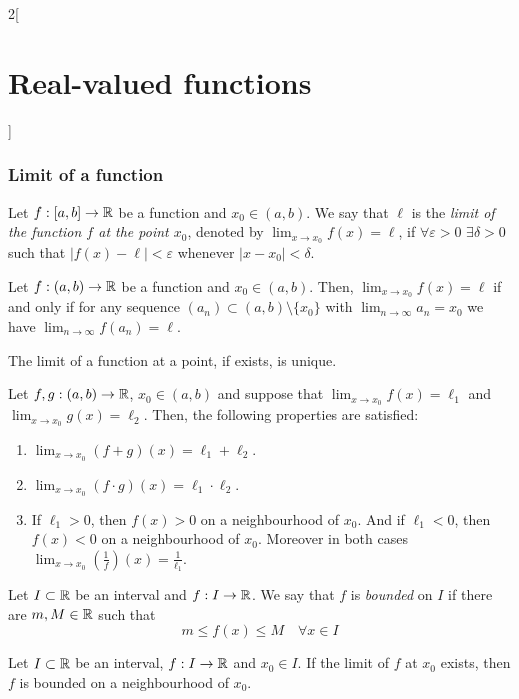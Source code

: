 \documentclass[../../../main_math.tex]{subfiles}
\begin{document}
\begin{multicols}{2}[\section{Real-valued functions}]
  \subsubsection{Limit of a function}
  \begin{definition}
    Let $f:[a,b]\rightarrow\mathbb{R}$ be a function and $x_0\in(a,b)$. We say that $\ell$ is the \emph{limit of the function $f$ at the point $x_0$}, denoted by $\displaystyle\lim_{x\to x_0}f(x)=\ell$, if $\forall\varepsilon>0$ $\exists\delta>0$ such that $|f(x)-\ell|<\varepsilon$ whenever $|x-x_0|<\delta$.
  \end{definition}
  \begin{lemma}
    Let $f:(a,b)\rightarrow\mathbb{R}$ be a function and $x_0\in(a,b)$. Then, $\displaystyle\lim_{x\to x_0}f(x)=\ell$ if and only if for any sequence $(a_n)\subset(a,b)\setminus\{x_0\}$ with $\displaystyle\lim_{n\to\infty} a_n=x_0$ we have $\displaystyle\lim_{n\to\infty}  f(a_n)=\ell$.
  \end{lemma}
  \begin{lemma}
    The limit of a function at a point, if exists, is unique.
  \end{lemma}
  \begin{proposition}
    Let $f,g:(a,b)\rightarrow\mathbb{R}$, $x_0\in(a,b)$ and suppose that $\displaystyle\lim_{x\to x_0}f(x)=\ell_1$ and $\displaystyle\lim_{x\to x_0}g(x)=\ell_2$. Then, the following properties are satisfied:
    \begin{enumerate}
      \item $\displaystyle\lim_{x\to x_0}(f+g)(x)=\ell_1+\ell_2$.
      \item $\displaystyle\lim_{x\to x_0}(f\cdot g)(x)=\ell_1\cdot\ell_2$.
      \item If $\ell_1>0$, then $f(x)>0$ on a neighbourhood of $x_0$. And if $\ell_1<0$, then $f(x)<0$ on a neighbourhood of $x_0$. Moreover in both cases $\displaystyle\lim_{x\to x_0}\left(\frac{1}{f}\right)(x)=\frac{1}{\ell_1}$.
    \end{enumerate}
  \end{proposition}
  \begin{definition}
    Let $I\subset\mathbb{R}$ be an interval and $f:I\rightarrow\mathbb{R}$. We say that $f$ is \emph{bounded} on $I$ if there are $m,M\in\mathbb{R}$ such that $$m\leq f(x)\leq M\quad\forall x\in I$$
  \end{definition}
  \begin{lemma}
    Let $I\subset\mathbb{R}$ be an interval, $f:I\rightarrow\mathbb{R}$ and $x_0\in I$. If the limit of $f$ at $x_0$ exists, then $f$ is bounded on a neighbourhood of $x_0$.

\end{lemma}
\end{multicols}
\end{document}
